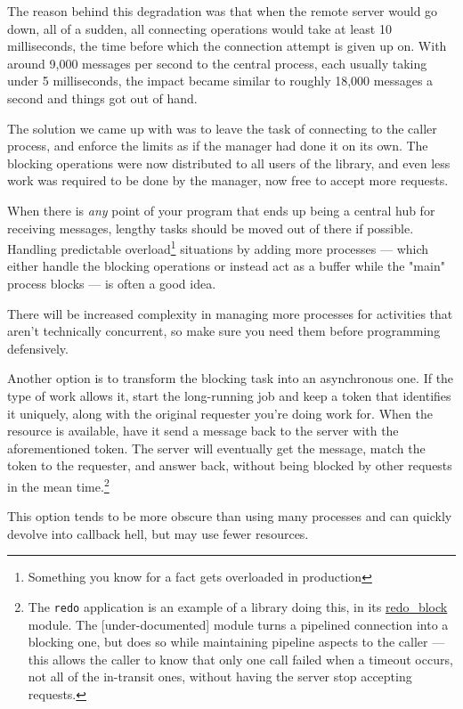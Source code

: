 \documentclass[11pt, oneside]{book}   	%
\newcommand{\otpapp}[1]{\Verb`#1`}
\begin{document}
The reason behind this degradation was that when the remote server would go down, all of a sudden, all connecting operations would take at least 10 milliseconds, the time before which the connection attempt is given up on. With around 9,000 messages per second to the central process, each usually taking under 5 milliseconds, the impact became similar to roughly 18,000 messages a second and things got out of hand.

The solution we came up with was to leave the task of connecting to the caller process, and enforce the limits as if the manager had done it on its own. The blocking operations were now distributed to all users of the library, and even less work was required to be done by the manager, now free to accept more requests.

When there is \emph{any} point of your program that ends up being a central hub for receiving messages, lengthy tasks should be moved out of there if possible. Handling predictable overload\footnote{Something you know for a fact gets overloaded in production} situations by adding more processes — which either handle the blocking operations or instead act as a buffer while the "main" process blocks — is often a good idea.

There will be increased complexity in managing more processes for activities that aren't technically concurrent, so make sure you need them before programming defensively.

Another option is to transform the blocking task into an asynchronous one. If the type of work allows it, start the long-running job and keep a token that identifies it uniquely, along with the original requester you're doing work for. When the resource is available, have it send a message back to the server with the aforementioned token. The server will eventually get the message, match the token to the requester, and answer back, without being blocked by other requests in the mean time.\footnote{The \otpapp{redo} application is an example of a library doing this, in its \href{https://github.com/heroku/redo/blob/master/src/redo\_block.erl}{redo\_block} module. The [under-documented] module turns a pipelined connection into a blocking one, but does so while maintaining pipeline aspects to the caller — this allows the caller to know that only one call failed when a timeout occurs, not all of the in-transit ones, without having the server stop accepting requests.}

This option tends to be more obscure than using many processes and can quickly devolve into callback hell, but may use fewer resources.
\end{document}
